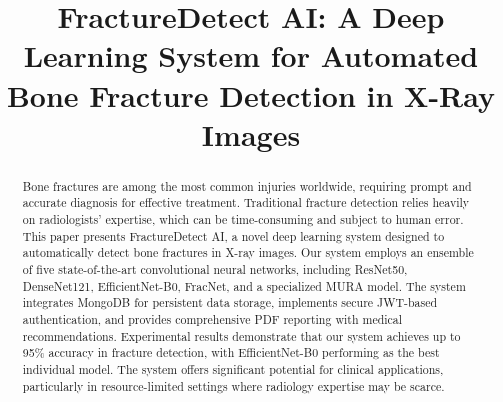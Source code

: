 \documentclass[conference]{IEEEtran}
\begin{document}
\title{FractureDetect AI: A Deep Learning System for Automated Bone Fracture Detection in X-Ray Images}

\author{
\and
{}
\and
{}
\and
{}
}

\maketitle

\begin{abstract}
Bone fractures are among the most common injuries worldwide, requiring prompt and accurate diagnosis for effective treatment. Traditional fracture detection relies heavily on radiologists' expertise, which can be time-consuming and subject to human error. This paper presents FractureDetect AI, a novel deep learning system designed to automatically detect bone fractures in X-ray images. Our system employs an ensemble of five state-of-the-art convolutional neural networks, including ResNet50, DenseNet121, EfficientNet-B0, FracNet, and a specialized MURA model. The system integrates MongoDB for persistent data storage, implements secure JWT-based authentication, and provides comprehensive PDF reporting with medical recommendations. Experimental results demonstrate that our system achieves up to 95\% accuracy in fracture detection, with EfficientNet-B0 performing as the best individual model. The system offers significant potential for clinical applications, particularly in resource-limited settings where radiology expertise may be scarce.
\end{abstract}
\end{document}

